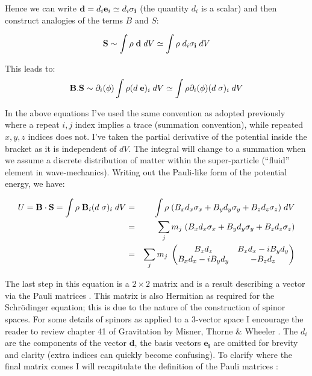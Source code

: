 Hence we can write $\mathbf{d}= d_i\mathbf{e}_i \simeq d_i {\bf \sigma_i}$ (the quantity $d_i$ is a scalar) and then construct analogies of the terms $B$ and $S$:

\begin{equation}
{\bf S} \sim \int \rho \;{\bf d}\;dV \simeq \int \rho\; d_i {\bf \sigma_i} \;dV 
\end{equation}

\noindent This leads to:
\begin{equation}
{\bf B}.{\bf S} \sim \partial_i(\phi) \int \rho (d \; {\bf e})_i \;dV \simeq \int \rho \partial_i(\phi) (d \; \sigma)_i \;dV 
\end{equation}

\noindent In the above equations I've used the same convention as adopted previously where a repeat $i, j$ index implies a trace (summation convention), while repeated $x,y,z$ indices does not. I've taken the partial derivative of the potential inside the bracket as it is independent of $dV$. The integral will change to a summation when we assume a discrete distribution of matter within the super-particle (``fluid'' element in wave-mechanics). Writing out the Pauli-like form of the potential energy, we have:

\begin{eqnarray}
\label{pdipole}
U = {\bf B}\cdot{\bf S} = \int \rho\; {\bf B}_i (d \; \sigma)_i \;dV &=& \int \rho\; (B_x d_x\sigma_x + B_y d_y\sigma_y + B_z d_z\sigma_z) \;dV \\
 &=& \sum_j m_j\; (B_x d_x\sigma_x + B_y d_y\sigma_y + B_z d_z\sigma_z) \\
 &=& \sum_j m_j\;\begin{pmatrix}
B_z d_z & B_x d_x - i B_y d_y\\
B_x d_x - i B_y d_y & - B_z d_z
\end{pmatrix}
\end{eqnarray}

\noindent The last step in this equation is a $2\times 2$ matrix and is a result describing a vector via the Pauli matrices \citep{bib_lou}. This matrix is also Hermitian as required for the Schr\"odinger equation; this is due to the nature of the construction of spinor spaces. For some details of spinors as applied to a 3-vector space I encourage the reader to review chapter 41 of Gravitation by Misner, Thorne \& Wheeler \citep{bib_grav}. The $d_i$ are the components of the vector $\mathbf{d}$, the basis vectors $\mathbf{e_i}$ are omitted for brevity and clarity (extra indices can quickly become confusing). To clarify where the final matrix comes I will recapitulate the definition of the Pauli matrices \citep{bib_lou}:

